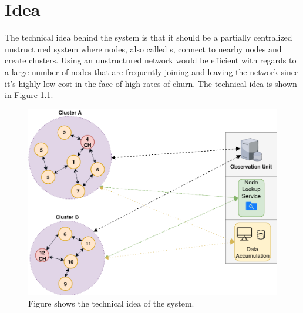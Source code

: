 \documentclass[USenglish]{uit-thesis}
\begin{document}
\chapter{Idea} \label{chap:idea}





The technical idea behind the system is that it should be a partially centralized unstructured  system where nodes, also called s, connect to nearby nodes and create clusters. Using an unstructured network would be efficient with regards to a large number of nodes that are frequently joining and leaving the network since it's highly low cost in the face of high rates of churn. The technical idea is shown in Figure \ref{fig:idea}. 

\begin{figure}
\centering
\includegraphics[width=\textwidth]{idea.png}
\caption{Figure shows the technical idea of the system.}
\label{fig:idea}
\end{figure}
\end{document}
